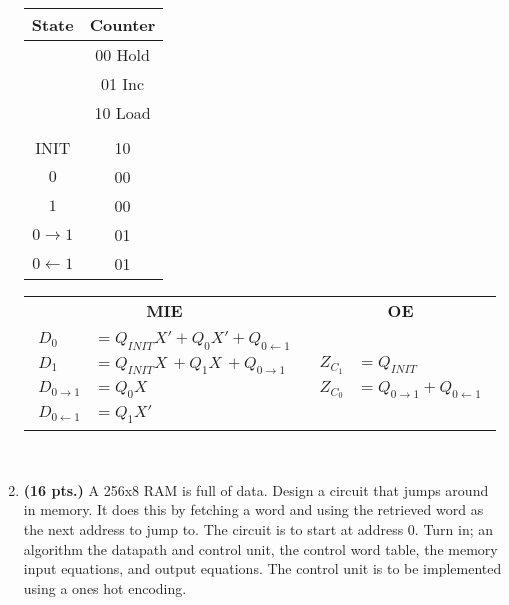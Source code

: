 \begin{enumerate}
\begin{onlysolution}[fragile]
            \begin{tabular}{c|c}
                State     & Counter \\ \hline
                & 00 Hold \\ \hline
                & 01 Inc  \\ \hline
                & 10 Load \\ \hline
                &         \\ \hline
                INIT      & 10      \\ \hline
                $0$       & 00      \\ \hline
                $1$       & 00      \\ \hline
                $0\to1$   & 01      \\ \hline
                $0\gets1$ & 01      \\
            \end{tabular}

            \begin{tabular}{cc}
                \textbf{MIE}                                        & \textbf{OE} \\
                {$
                    \begin{aligned}
                        D_{0}       & = Q_{INIT}X' + Q_0X' + Q_{0\gets1} \\
                        D_{1}       & = Q_{INIT}X\,+ Q_1X\,+ Q_{0\to1}   \\
                        D_{0\to1}   & = Q_{0}X                           \\
                        D_{0\gets1} & = Q_{1}X'
                \end{aligned}$} &
                {$
                    \begin{aligned}
                        Z_{C_1} & = Q_{INIT}                \\
                        Z_{C_0} & = Q_{0\to1} + Q_{0\gets1}
                \end{aligned}$}
            \end{tabular}\\
        \end{onlysolution}
    \item \textbf{ (16 pts.)}
        A 256x8 RAM is full of data.  Design a circuit that jumps
        around in memory.  It does this by fetching a word and using the
        retrieved word as the next address to jump to.  The circuit is to
        start at address 0.
        Turn in; an algorithm the datapath and control unit, the control word
        table, the memory input equations, and output equations.
        The control unit is to be implemented using a ones hot encoding.


\end{enumerate}
